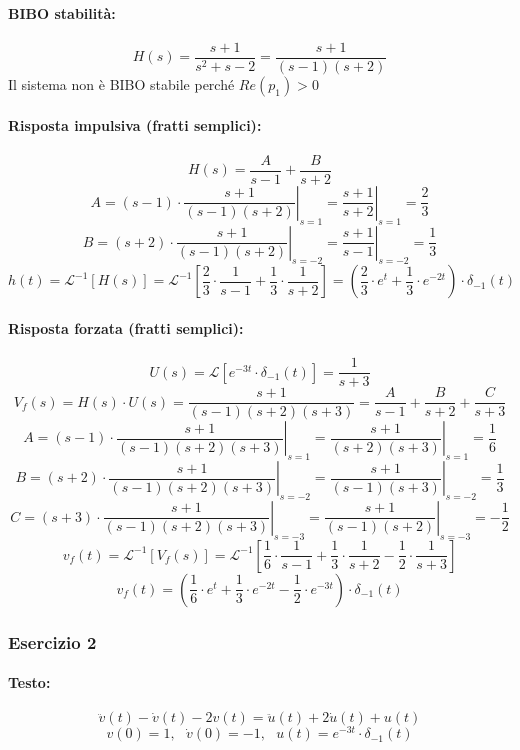 \documentclass[a4paper]{article}
\begin{document}
	\paragraph{BIBO stabilità:}
	\[ H(s) = \frac{s + 1}{s^2 + s - 2} = \frac{s + 1}{(s - 1)(s + 2)} \]
	Il sistema non è BIBO stabile perché $Re(p_1)>0$
	
	\paragraph{Risposta impulsiva (fratti semplici):}
	\[ H(s) = \frac{A}{s - 1} + \frac{B}{s + 2} \]
	\[ A = \left. (s-1) \cdot \frac{s + 1}{(s-1)(s+2)} \right|_{s=1} = \left. \frac{s + 1}{s + 2} \right|_{s=1} = \frac{2}{3} \]
	\[ B = \left. (s+2) \cdot \frac{s + 1}{(s-1)(s+2)} \right|_{s=-2} = \left. \frac{s + 1}{s - 1} \right|_{s=-2} = \frac{1}{3} \]
	\[
	h(t) = \mathcal{L}^{-1} [H(s)] = \mathcal{L}^{-1} \left[ \frac{2}{3} \cdot \frac{1}{s - 1} + \frac{1}{3} \cdot \frac{1}{s + 2} \right] = \left( \frac{2}{3} \cdot e^{t} + \frac{1}{3} \cdot e^{-2t} \right) \cdot \delta_{-1}(t)
	\]
	
	\paragraph{Risposta forzata (fratti semplici):}
	\[ U(s) = \mathcal{L} \left[ e^{-3t} \cdot \delta_{-1}(t) \right] = \frac{1}{s+3} \]
	\[ V_f(s) = H(s) \cdot U(s) = \frac{s + 1}{(s - 1)(s + 2)(s + 3)} = \frac{A}{s - 1} + \frac{B}{s + 2} + \frac{C}{s + 3} \]
	\[ A = \left. (s-1) \cdot \frac{s+1}{(s-1)(s+2)(s+3)} \right|_{s=1} = \left. \frac{s+1}{(s+2)(s+3)} \right|_{s=1} = \frac{1}{6} \]
	\[ B = \left. (s+2) \cdot \frac{s+1}{(s-1)(s+2)(s+3)} \right|_{s=-2} = \left. \frac{s+1}{(s-1)(s+3)} \right|_{s=-2} = \frac{1}{3} \]
	\[ C = \left. (s+3) \cdot \frac{s+1}{(s-1)(s+2)(s+3)} \right|_{s=-3} = \left. \frac{s+1}{(s-1)(s+2)} \right|_{s=-3} = - \frac{1}{2} \]
	\[
	v_f(t) = \mathcal{L}^{-1} [V_f(s)] = \mathcal{L}^{-1} \left[ \frac{1}{6} \cdot \frac{1}{s - 1} + \frac{1}{3} \cdot \frac{1}{s + 2} - \frac{1}{2} \cdot \frac{1}{s + 3} \right]
	\]
	\[ v_f(t) = \left( \frac{1}{6} \cdot e^{t} + \frac{1}{3} \cdot e^{-2t} - \frac{1}{2} \cdot e^{-3t} \right) \cdot \delta_{-1}(t) \]
	
	
	\subsubsection{Esercizio 2}
	\paragraph{Testo:}
	\[ \ddot{v}(t) - \dot{v}(t)	- 2 v(t) = \ddot{u}(t) + 2 \dot{u}(t) + u(t) \]
	\[ v(0) = 1, \text{ } \dot{v}(0) = -1, \text{ } u(t) = e^{-3t} \cdot \delta_{-1}(t) \]
	
\end{document}
